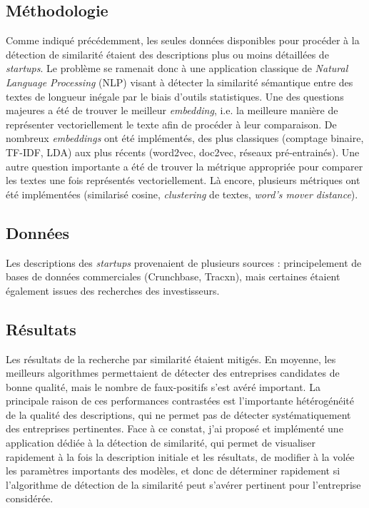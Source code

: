 \documentclass[12pt]{article}
\begin{document}
\subsection{Méthodologie}

Comme indiqué précédemment, les seules données disponibles pour procéder à la détection de similarité étaient des descriptions plus ou moins détaillées de \textit{startups}. Le problème se ramenait donc à une application classique de \textit{Natural Language Processing} (NLP) visant à détecter la similarité sémantique entre des textes de longueur inégale par le biais d'outils statistiques. Une des questions majeures a été de trouver le meilleur \textit{embedding}, i.e. la meilleure manière de représenter vectoriellement le texte afin de procéder à leur comparaison. De nombreux \textit{embeddings} ont été implémentés, des plus classiques (comptage binaire, TF-IDF, LDA) aux plus récents (word2vec, doc2vec, réseaux pré-entrainés). Une autre question importante a été de trouver la métrique appropriée pour comparer les textes une fois représentés vectoriellement. Là encore, plusieurs métriques ont été implémentées (similarisé cosine, \textit{clustering} de textes, \textit{word's mover distance}).

\subsection{Données}

Les descriptions des \textit{startups} provenaient de plusieurs sources : principelement de bases de données commerciales (Crunchbase, Tracxn), mais certaines étaient également issues des recherches des investisseurs.

\subsection{Résultats}

Les résultats de la recherche par similarité étaient mitigés. En moyenne, les meilleurs algorithmes permettaient de détecter des entreprises candidates de bonne qualité, mais le nombre de faux-positifs s'est avéré important. La principale raison de ces performances contrastées est l'importante hétérogénéité de la qualité des descriptions, qui ne permet pas de détecter systématiquement des entreprises pertinentes. Face à ce constat, j'ai proposé et implémenté une application dédiée à la détection de similarité, qui permet de visualiser rapidement à la fois la description initiale et les résultats, de modifier à la volée les paramètres importants des modèles, et donc de déterminer rapidement si l'algorithme de détection de la similarité peut s'avérer pertinent pour l'entreprise considérée.
\end{document}
